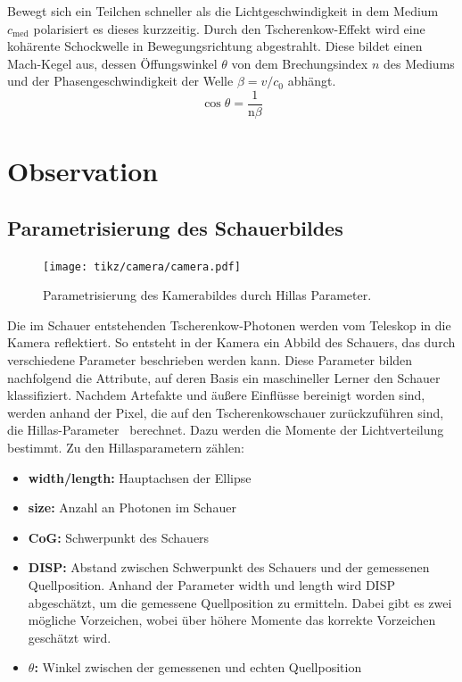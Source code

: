 Bewegt sich ein Teilchen schneller als die Lichtgeschwindigkeit in dem Medium $c_\text{med}$ polarisiert es dieses kurzzeitig. 
Durch den Tscherenkow-Effekt wird eine kohärente Schockwelle in Bewegungsrichtung abgestrahlt. 
Diese bildet einen Mach-Kegel aus, dessen Öffungswinkel $\theta$ von dem Brechungsindex $n$ des Mediums und der Phasengeschwindigkeit der Welle $\beta = v / c_\text{0}$ abhängt.
\begin{equation}
  \cos  \theta = \frac{1}{\text{n} \beta}
\end{equation}
\chapter{Observation}
\section{Parametrisierung des Schauerbildes}
\begin{figure}[H]
  \centering
  \texttt{[image: tikz/camera/camera.pdf]}
  \caption{Parametrisierung des Kamerabildes durch Hillas Parameter.}
\end{figure}
Die im Schauer entstehenden Tscherenkow-Photonen werden vom Teleskop in die Kamera reflektiert.
So entsteht in der Kamera ein Abbild des Schauers, das durch verschiedene Parameter beschrieben werden kann.
Diese Parameter bilden nachfolgend die Attribute, auf deren Basis ein maschineller Lerner den Schauer klassifiziert.
Nachdem Artefakte und äußere Einflüsse bereinigt worden sind, werden anhand der Pixel, die auf den Tscherenkowschauer zurückzuführen sind, die Hillas-Parameter~\cite{hillas} berechnet. 
Dazu werden die Momente der Lichtverteilung bestimmt. 
Zu den Hillasparametern zählen:
\begin{itemize}
  \item \textbf{width/length:} Hauptachsen der Ellipse
  \item \textbf{size:} Anzahl an Photonen im Schauer
  \item \textbf{CoG:} Schwerpunkt des Schauers
  \item \textbf{DISP:} Abstand zwischen Schwerpunkt des Schauers und der gemessenen Quellposition. Anhand der Parameter width und length wird DISP abgeschätzt, um die gemessene Quellposition zu ermitteln. Dabei gibt es zwei mögliche Vorzeichen, wobei über höhere Momente das korrekte Vorzeichen geschätzt wird.
  \item \textbf{$\theta$:} Winkel zwischen der gemessenen und echten Quellposition
\end{itemize}
